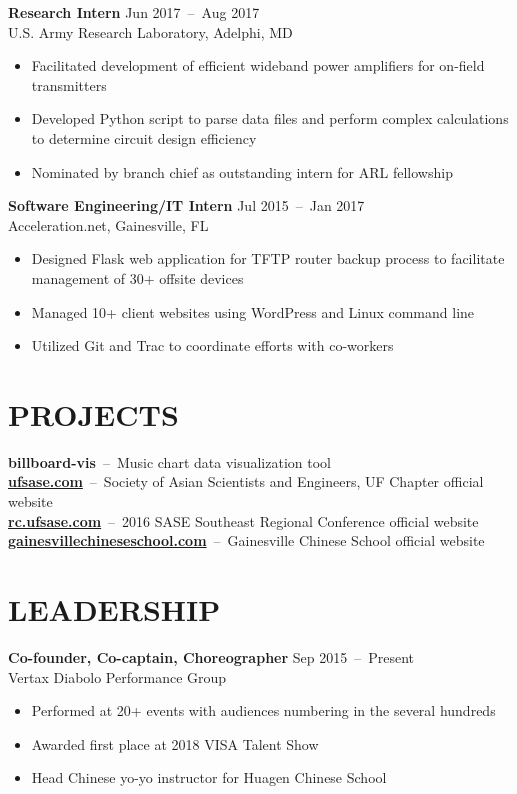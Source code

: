 \documentclass[line,resmargin]{res}
\begin{document}
\begin{resume}
    \textbf{Research Intern}    \hfill Jun 2017~--~Aug 2017 \\
    U.S. Army Research Laboratory, Adelphi, MD
    \begin{itemize}  \itemsep -2pt
        \item Facilitated development of efficient wideband power amplifiers for on-field transmitters
        \item Developed Python script to parse data files and perform complex calculations to determine circuit design efficiency
        \item Nominated by branch chief as outstanding intern for ARL fellowship
    \end{itemize}

    \textbf{Software Engineering/IT Intern}    \hfill Jul 2015~--~Jan 2017 \\
    Acceleration.net, Gainesville, FL
    \begin{itemize}  \itemsep -2pt
        \item Designed Flask web application for TFTP router backup process to facilitate management of 30+ offsite devices
        \item Managed 10+ client websites using WordPress and Linux command line
        \item Utilized Git and Trac to coordinate efforts with co-workers
    \end{itemize}

\section{PROJECTS}
    \textbf{billboard-vis}~--~Music chart data visualization tool \\
    \textbf{\href{http://ufsase.com}{ufsase.com}}~--~Society of Asian Scientists and Engineers, UF Chapter official website \\
    \textbf{\href{http://rc.ufsase.com}{rc.ufsase.com}}~--~2016 SASE Southeast Regional Conference official website \\
    \textbf{\href{https://gainesvillechineseschool.com}{gainesvillechineseschool.com}}~--~Gainesville Chinese School official website

\section{LEADERSHIP}
    \textbf{Co-founder, Co-captain, Choreographer}    \hfill Sep 2015~--~Present \\
    Vertax Diabolo Performance Group
    \begin{itemize}  \itemsep -2pt
        \item Performed at 20+ events with audiences numbering in the several hundreds
        \item Awarded first place at 2018 VISA Talent Show
        \item Head Chinese yo-yo instructor for Huagen Chinese School
    \end{itemize}


\end{resume}
\end{document}
